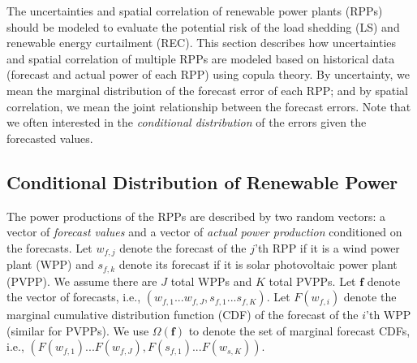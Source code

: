 The uncertainties and spatial correlation of renewable power plants (RPPs) should be modeled to evaluate the potential risk of the load shedding {(LS)} and renewable energy curtailment {(REC)}. This section describes how uncertainties and spatial correlation of multiple RPPs are modeled based on historical data (forecast and actual power of each RPP) using copula theory.
By uncertainty, we mean the marginal distribution of the forecast error of each RPP; and by spatial correlation, we mean the joint relationship between the forecast errors. Note that we often interested in the \emph{conditional distribution} of the errors given the forecasted values.


\subsection {Conditional Distribution of Renewable Power}
The power productions of the RPPs are described by two random vectors: a vector of \emph{forecast values} and a vector of \emph{actual power production} conditioned on the forecasts. Let $w_{f,j}$ denote the forecast of the $j$'th RPP if it is a wind power plant (WPP) and $s_{f,k}$ denote its forecast if it is solar photovoltaic power plant (PVPP). We assume there are $J$ total WPPs and $K$ total PVPPs. Let {$\mathbf{f}$} denote the vector of forecasts, i.e., $(w_{f,{1}}...w_{f,J},s_{f,{1}}...s_{f,K})$. Let $F(w_{f,i})$ denote the marginal cumulative distribution function (CDF) of the forecast of the $i$'th WPP (similar for PVPPs). We use {$\Omega(\mathbf{f})$} to denote the set of marginal forecast CDFs, i.e., $(F(w_{f,{1}})...F(w_{f,J}),F(s_{f,{1}})...F(w_{s,K}))$.


